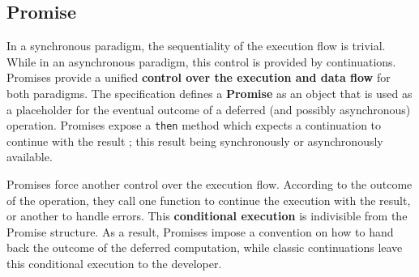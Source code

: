 \subsection{Promise} \label{section:definitions:promise}



In a synchronous paradigm, the sequentiality of the execution flow is trivial.
While in an asynchronous paradigm, this control is provided by continuations.
Promises provide a unified \textbf{control over the execution and data flow} for both paradigms.
The specification defines a \textbf{Promise} as an object that is used as a placeholder for the eventual outcome of a deferred (and possibly asynchronous) operation.
Promises expose a \texttt{then} method which expects a continuation to continue with the result ; this result being synchronously or asynchronously available.


Promises force another control over the execution flow.
According to the outcome of the operation, they call one function to continue the execution with the result, or another to handle errors.
This \textbf{conditional execution} is indivisible from the Promise structure.
As a result, Promises impose a convention on how to hand back the outcome of the deferred computation, while classic continuations leave this conditional execution to the developer.

